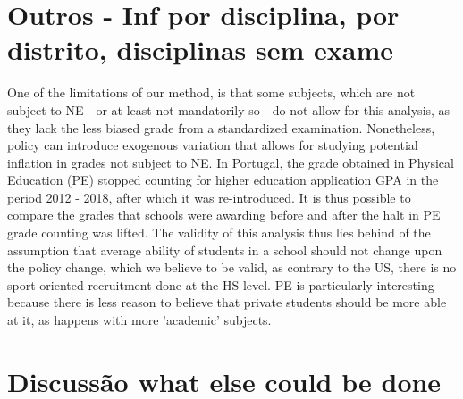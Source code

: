 \documentclass{article}
\begin{document}
\section{Outros - Inf por disciplina, por distrito, disciplinas sem exame}

One of the limitations of our method, is that some subjects, which are not subject to NE - or at least not mandatorily so - do not allow for this analysis, as they lack the less biased grade from a standardized examination. Nonetheless, policy can introduce exogenous variation that allows for studying potential inflation in grades not subject to NE. In Portugal, the grade obtained in Physical Education (PE) stopped counting for higher education application GPA in the period 2012 - 2018, after which it was re-introduced. It is thus possible to compare the grades that schools were awarding before and after the halt in PE grade counting was lifted. The validity of this analysis thus lies behind of the assumption that average ability of students in a school should not change upon the policy change, which we believe to be valid, as contrary to the US, there is no sport-oriented recruitment done at the HS level. PE is particularly interesting because there is less reason to believe that private students should be more able at it, as happens with more 'academic' subjects.



\section{Discussão what else could be done}
\end{document}
